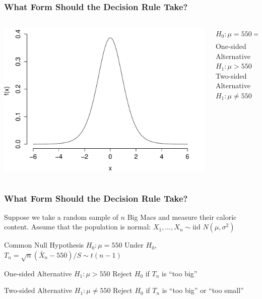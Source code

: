 \documentclass[handout]{beamer}
\begin{document}
\begin{frame}
\frametitle{What Form Should the Decision Rule Take?}
\begin{columns}
\begin{column}[l]{6cm}
\includegraphics[scale = 0.5]{./images/t_pdf}
\end{column}

\begin{column}[r]{6cm}
$H_0\colon \mu=550 \Rightarrow \displaystyle \frac{\bar{X}_n - 550}{S/\sqrt{n}} \sim t(n-1)$\\ \pause
\vspace{1em}
One-sided Alternative $H_1\colon \mu > 550$\\ \pause
\vspace{1em}
Two-sided Alternative $H_1\colon \mu \neq 550$ 
\end{column}

\end{columns}
 
\end{frame}


\begin{frame}
\frametitle{What Form Should the Decision Rule Take?}
Suppose we take a random sample of $n$ Big Macs and measure their caloric content. Assume that the population is normal: $X_1, \hdots, X_n \sim \mbox{iid } N(\mu, \sigma^2)$ 
\begin{block}{Common Null Hypothesis $H_0\colon \mu = 550$}
Under $H_0$, $T_n = \sqrt{n}(\bar{X}_n - 550)/S \sim t(n-1)$ 
\end{block}
\begin{block}{One-sided Alternative $H_1\colon \mu > 550$}
Reject $H_0$ if $T_n$ is ``too big'' 
\end{block}
\begin{block}{Two-sided Alternative $H_1\colon \mu \neq 550$} 
Reject $H_0$ if $T_n$ is ``too big'' or ``too small''
\end{block}
\end{frame}
\end{document}
